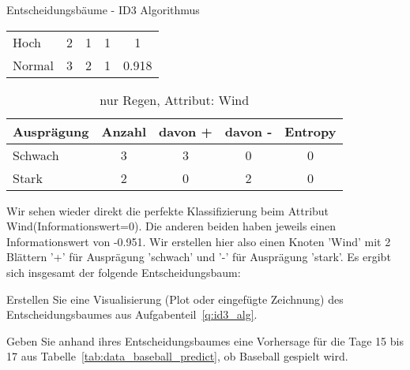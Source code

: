 \begin{task}[credit=16]{Entscheidungsbäume - ID3 Algorithmus}
\begin{subtask}[points=10,title=ID3 Algorithmus]
\begin{solution}
\begin{table}[H]
\begin{tabular}{l|c|c|c|c}
		\midrule
		Hoch&2&1&1&1\\
		Normal&3&2&1&0.918\\
		\bottomrule
	\end{tabular}
\end{table}
\begin{table}[H]
	\centering
	\caption{nur Regen, Attribut: Wind}
	\begin{tabular}{l|c|c|c|c}
		\toprule
		\textbf{Ausprägung} & \textbf{Anzahl} & \textbf{davon +}  & \textbf{davon -} &\textbf{Entropy} \\
		\midrule
		Schwach&3&3&0&0\\
		Stark&2&0&2&0\\
		\bottomrule
	\end{tabular}
\end{table}
Wir sehen wieder direkt die perfekte Klassifizierung beim Attribut Wind(Informationswert=0). Die anderen beiden haben jeweils einen Informationswert von -0.951. Wir erstellen hier also einen Knoten 'Wind' mit 2 Blättern '+' für Ausprägung 'schwach' und '-' für Ausprägung 'stark'. Es ergibt sich insgesamt der folgende Entscheidungsbaum:
\end{solution}

\end{subtask}

\begin{subtask}[points=3,title=Visualisierung]
Erstellen Sie eine Visualisierung (Plot oder eingefügte Zeichnung) des Entscheidungsbaumes aus Aufgabenteil~\ref{q:id3_alg}.

\begin{solution}
\end{solution}

\end{subtask}

\begin{subtask}[points=3,title=Vorhersage]
Geben Sie anhand ihres Entscheidungsbaumes eine Vorhersage für die Tage 15 bis 17 aus Tabelle~\ref{tab:data_baseball_predict}, ob Baseball gespielt wird.

\begin{solution}
\end{solution}

\end{subtask}
\end{task}